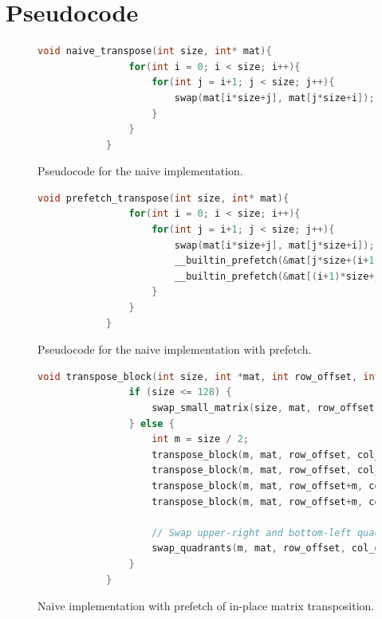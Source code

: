 \documentclass{scrartcl}
\begin{document}
    \newpage
    \printbibliography

    \appendix
    \section{Pseudocode}

    \begin{figure}[h!]
        \begin{lstlisting}[language=C]
            void naive_transpose(int size, int* mat){
                for(int i = 0; i < size; i++){
                    for(int j = i+1; j < size; j++){
                        swap(mat[i*size+j], mat[j*size+i]);
                    }
                }
            }
        \end{lstlisting}
        \caption{Pseudocode for the naive implementation.}
        \label{fig:naive_implementation}        
    \end{figure}

    \begin{figure}[h!]
        \begin{lstlisting}[language=C]
            void prefetch_transpose(int size, int* mat){
                for(int i = 0; i < size; i++){
                    for(int j = i+1; j < size; j++){
                        swap(mat[i*size+j], mat[j*size+i]);
                        __builtin_prefetch(&mat[j*size+(i+1)], 0, 1);
                        __builtin_prefetch(&mat[(i+1)*size+j], 1, 1);
                    }
                }
            }
        \end{lstlisting}
        \caption{Pseudocode for the naive implementation with prefetch.}
        \label{fig:prefetch_implementation}        
    \end{figure}

    \begin{figure}[h!]
        \begin{lstlisting}[language=C]
            void transpose_block(int size, int *mat, int row_offset, int col_offset) {
                if (size <= 128) {
                    swap_small_matrix(size, mat, row_offset, col_offset);
                } else {
                    int m = size / 2;
                    transpose_block(m, mat, row_offset, col_offset);
                    transpose_block(m, mat, row_offset, col_offset+m);
                    transpose_block(m, mat, row_offset+m, col_offset);
                    transpose_block(m, mat, row_offset+m, col_offset+m);
            
                    // Swap upper-right and bottom-left quadrants
                    swap_quadrants(m, mat, row_offset, col_offset);
                }
            }
        \end{lstlisting}
        \caption{Naive implementation with prefetch of in-place matrix transposition.}
        \label{fig:rec_implementation}        
    \end{figure}
\end{document}
